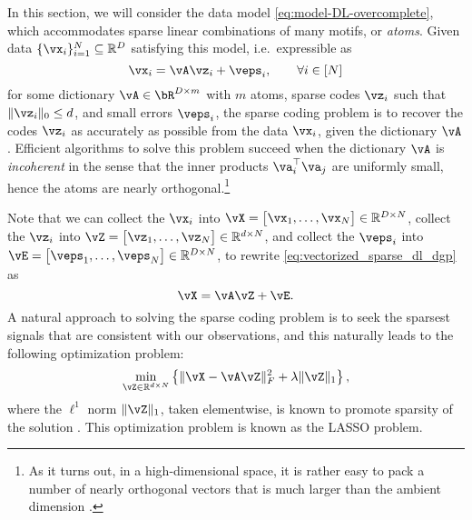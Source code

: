 \documentclass[../../book-main.tex]{subfiles}
\begin{document}
In this section, we will consider the data model
\eqref{eq:model-DL-overcomplete}, which accommodates sparse linear combinations
of many motifs, or \textit{atoms}. Given data \(\{\vx_{i}\}_{i = 1}^{N} \subseteq
\R^{D}\) satisfying this model, i.e.\ expressible as
\begin{equation}\label{eq:vectorized_sparse_dl_dgp}
    \vx_{i} = \vA\vz_{i} + \veps_{i}, \qquad \forall i \in [N]
\end{equation}
for some dictionary $\vA \in \bR^{D \times m}$ with $m$ atoms, sparse codes
$\vz_i$ such that $\norm{\vz_i}_0 \leq d$, and small errors $\veps_i$,
the sparse coding problem is to recover the codes $\vz_i$ as accurately as
possible from the data $\vx_i$, given the dictionary $\vA$.
Efficient algorithms to solve this problem succeed when
the dictionary \(\vA\) is \textit{incoherent} in the sense that the inner
products \(\va_{i}^{\top}\va_{j}\) are uniformly small, hence the atoms are
nearly orthogonal.\footnote{As it turns out, in a high-dimensional space, it is
rather easy to pack a number of nearly orthogonal vectors that is much larger
than the ambient dimension \cite{Wright-Ma-2022}. } 


Note that we can collect the \(\vx_{i}\) into \(\vX = \mat{\vx_{1}, \dots, \vx_{N}} \in \R^{D \times N}\), collect the \(\vz_{i}\) into \(\vZ = \mat{\vz_{1}, \dots, \vz_{N}} \in \R^{d  \times N}\), and collect the \(\veps_{i}\) into \(\vE = \mat{\veps_{1}, \dots, \veps_{N}} \in \R^{D \times N}\), to rewrite \eqref{eq:vectorized_sparse_dl_dgp} as 
\begin{equation}\label{eq:sparse_dl_dgp}
    \vX = \vA\vZ + \vE.
\end{equation}
A natural approach to solving the sparse coding problem is to seek the sparsest
signals that are consistent with our observations, and this naturally leads to
the following optimization problem:
\begin{equation}\label{eq:sparse_dl_lasso}
    \min_{\vZ \in \R^{d \times N}}\bc{\norm{\vX - \vA\vZ}_{F}^{2} + \lambda \norm{\vZ}_{1}},
\end{equation}
where the \(\ell^1\) norm \(\norm{\vZ}_{1}\), taken elementwise, is known to promote sparsity of the solution \cite{Wright-Ma-2022}. 
This optimization problem is known as the LASSO problem. 
\end{document}
